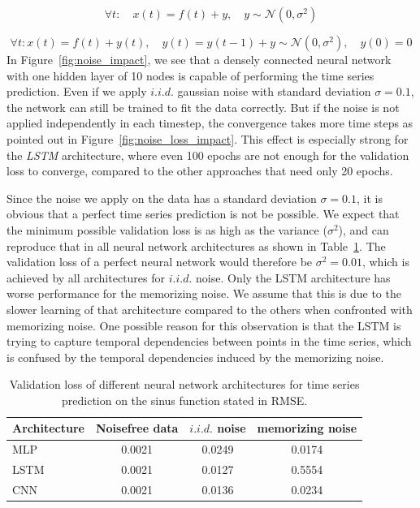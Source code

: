 \documentclass{article}
\begin{document}
\begin{equation}
  \forall t: \quad x(t) = f(t) + y, \quad y \sim \mathcal{N}(0, \sigma^2)
  \label{equ:iid_noise}
\end{equation}

\begin{equation}
  \forall t: x(t) = f(t) + y(t), \quad y(t) = y(t-1) + y \sim \mathcal{N}(0, \sigma^2), \quad y(0) = 0
  \label{equ:wiener}
\end{equation}
In Figure~\ref{fig:noise_impact}, we see that a densely connected neural network
with one hidden layer of 10 nodes is capable of performing the time series
prediction. Even if we apply $i.i.d.$ gaussian noise with standard
deviation $\sigma = 0.1$, the
network can still be trained to fit the data correctly. But if the noise is not
applied independently in each timestep, the convergence takes more time steps as
pointed out in Figure~\ref{fig:noise_loss_impact}. This effect is especially 
strong for the \emph{LSTM} architecture, where even 100 epochs are not enough
for the validation loss to converge, compared to the other approaches that need
only 20 epochs.

Since the noise we apply on the data has a standard deviation $\sigma = 0.1$,
it is obvious that a perfect time series prediction is not be possible. We 
expect that the minimum possible validation loss is as high as the variance 
($\sigma^2$), and can reproduce that in all neural network architectures as
shown in Table~\ref{tab:noise_finals}. The validation loss of a perfect
neural network would therefore be $\sigma^2 = 0.01$, which is achieved by all 
architectures for $i.i.d.$ noise. Only the LSTM architecture has worse
performance for the memorizing noise. We assume that this is due to the slower 
learning of that architecture compared to the others when confronted with
memorizing noise. One possible reason for this observation is that the LSTM is
trying to capture temporal dependencies between points in the time series, which
is confused by the temporal dependencies induced by the memorizing noise.

\begin{table}
  \centering
  \begin{tabular}{l|c|c|c}
    Architecture & Noisefree data & $i.i.d.$ noise & memorizing noise \\
    \hline
    MLP & 0.0021 & 0.0249 & 0.0174 \\
    LSTM & 0.0021 & 0.0127 & 0.5554 \\
    CNN & 0.0021 & 0.0136 & 0.0234 \\
  \end{tabular}
  \caption{Validation loss of different neural network architectures for 
  time series prediction on the sinus function stated 
  in RMSE.}
  \label{tab:noise_finals}
\end{table}
  
\end{document}
